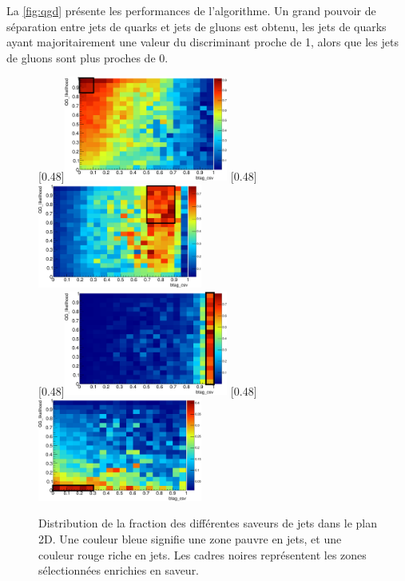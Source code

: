 La \cref{fig:qgd} présente les performances de l'algorithme. Un grand pouvoir de séparation entre jets de quarks et jets de gluons est obtenu, les jets de quarks ayant majoritairement une valeur du discriminant proche de 1, alors que les jets de gluons sont plus proches de 0.

\begin{figure}[p!] \centering
    [0.48\textwidth]{\includegraphics[width=0.48\textwidth]{chapitre4/figs/flavor/2DTaggingPlan_uds_ptPhot_100_800_stageM2.pdf}}
    [0.48\textwidth]{\includegraphics[width=0.48\textwidth]{chapitre4/figs/flavor/2DTaggingPlan_c_ptPhot_100_800_stageM2.pdf}} \\
    [0.48\textwidth]{\includegraphics[width=0.48\textwidth]{chapitre4/figs/flavor/2DTaggingPlan_b_ptPhot_100_800_stageM2.pdf}}
    [0.48\textwidth]{\includegraphics[width=0.48\textwidth]{chapitre4/figs/flavor/2DTaggingPlan_g_ptPhot_100_800_stageM2.pdf}}
    \caption{Distribution de la fraction des différentes saveurs de jets dans le plan 2D. Une couleur bleue signifie une zone pauvre en jets, et une couleur rouge riche en jets. Les cadres noires représentent les zones sélectionnées enrichies en saveur.}
    \label{fig:2d_zones}
\end{figure}

